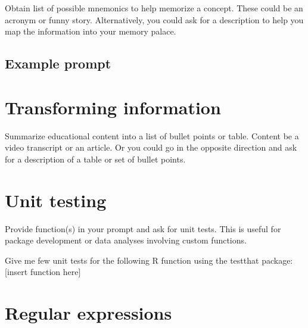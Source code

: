 \documentclass[
  letterpaper,
  DIV=11,
  numbers=noendperiod]{scrreprt}
\newenvironment{Shaded}{\begin{snugshade}}{\end{snugshade}}
\newcommand{\InformationTok}[1]{\textcolor[rgb]{0.37,0.37,0.37}{#1}}
\newcommand{\NormalTok}[1]{\textcolor[rgb]{0.00,0.23,0.31}{#1}}
\begin{document}
Obtain list of possible mnemonics to help memorize a concept. These
could be an acronym or funny story. Alternatively, you could ask for a
description to help you map the information into your memory palace.

\hypertarget{example-prompt}{%
\subsection{Example prompt}\label{example-prompt}}

\begin{Shaded}
\end{Shaded}

\hypertarget{transforming-information}{%
\section{Transforming information}\label{transforming-information}}

Summarize educational content into a list of bullet points or table.
Content be a video transcript or an article. Or you could go in the
opposite direction and ask for a description of a table or set of bullet
points.

\hypertarget{unit-testing}{%
\section{Unit testing}\label{unit-testing}}

Provide function(s) in your prompt and ask for unit tests. This is
useful for package development or data analyses involving custom
functions.

\begin{Shaded}
\begin{Highlighting}[]
\NormalTok{Give me few unit tests for the following R function using }
\NormalTok{the testthat package: }\InformationTok{\textasciigrave{}[insert function here]\textasciigrave{}}
\end{Highlighting}
\end{Shaded}

\hypertarget{regular-expressions}{%
\section{Regular expressions}\label{regular-expressions}}
\end{document}
